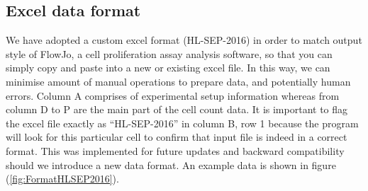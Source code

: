 \documentclass{article}
\begin{document}
\subsection{Excel data format}
\label{sec:data_format}
We have adopted a custom excel format (HL-SEP-2016) in order to match output style of FlowJo, a cell proliferation assay analysis software, so that you can simply copy and paste into a new or existing excel file. In this way, we can minimise amount of manual operations to prepare data, and potentially human errors. Column A comprises of experimental setup information whereas from column D to P are the main part of the cell count data. It is important to flag the excel file exactly as “HL-SEP-2016” in column B, row 1 because the program will look for this particular cell to confirm that input file is indeed in a correct format. This was implemented for future updates and backward compatibility should we introduce a new data format. An example data is shown in figure (\ref{fig:FormatHLSEP2016}).
\end{document}
